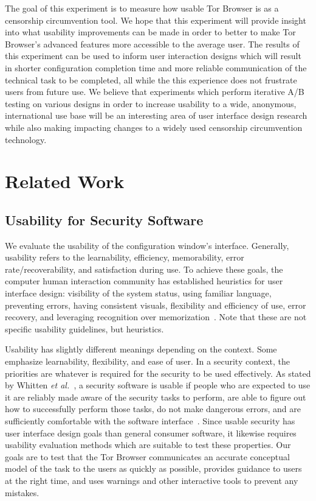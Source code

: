 \documentclass[letterpaper,twocolumn,11pt]{article}
\def\etal{{\it et al.~}}
\begin{document}
The goal of this experiment is to measure how usable Tor Browser is as a censorship circumvention
tool. We hope that this experiment will provide insight into what usability improvements can be made 
in order to better to make Tor Browser's advanced features more accessible to the average user. The results
of this experiment can be used to inform user interaction designs which will result in shorter configuration
completion time and more reliable communication of the technical task to be completed, all while the 
this experience does not frustrate users from future use. We believe that experiments which perform
iterative A/B testing on various designs in order to increase usability to a wide, anonymous, international 
use base will be an interesting area of user interface design research while also making impacting changes
to a widely used censorship circumvention technology. 

\section{Related Work}

\subsection{Usability for Security Software}
\indent \indent 
We evaluate the usability of the configuration window's interface. Generally, usability 
refers to the learnability, efficiency, memorability, error rate/recoverability, and satisfaction
during use. To achieve these goals, the computer human interaction community has established 
heuristics for user interface design: visibility of the system status, using familiar
language, preventing errors, having consistent visuals, flexibility and efficiency of use, 
error recovery, and leveraging recognition over memorization~\cite{nielsen199510}. Note
that these are not specific usability guidelines, but heuristics. 

Usability has slightly different meanings depending on the context. Some emphasize
learnability, flexibility, and ease of user. In a security context, the priorities are whatever is 
required for the security to be used effectively. As stated by Whitten \etal, a security software is 
usable if people who are expected to use it are reliably made aware of the security tasks to perform, 
are able to figure out how to successfully perform those tasks, do not make dangerous errors, and
are sufficiently comfortable with the software interface~\cite{whitten1999johnny}. Since usable security 
has user interface design goals than general consumer software, it likewise requires usability evaluation
methods which are suitable to test these properties. Our goals are to test that the Tor Browser 
communicates an accurate conceptual model of the task to the users as quickly as possible, provides guidance to 
users at the right time, and uses warnings and other interactive tools to prevent any mistakes. 
\end{document}
